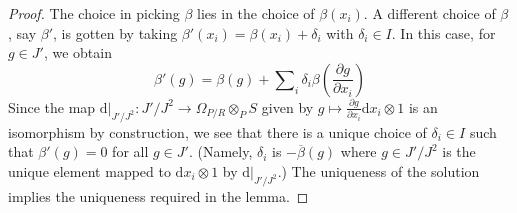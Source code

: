 \begin{proof}
The choice in picking $\beta$ lies in the choice of $\beta(x_i)$.
A different choice of $\beta$, say $\beta'$, is gotten by taking
$\beta'(x_i) = \beta(x_i) + \delta_i$ with $\delta_i \in I$.
In this case, for $g \in J'$, we obtain
$$
\beta'(g) =
\beta(g) + \sum\nolimits_i \delta_i \beta(\frac{\partial g}{\partial x_i})
$$
Since the map $\text{d}|_{J'/J^2} : J'/J^2 \to \Omega_{P/R} \otimes_P S$
given by $g \mapsto \frac{\partial g}{\partial x_i}\text{d}x_i \otimes 1$
is an isomorphism by construction, we see that there is a unique choice
of $\delta_i \in I$ such that $\beta'(g) = 0$ for all $g \in J'$.
(Namely, $\delta_i$ is $-\overline{\beta}(g)$ where $g \in J'/J^2$
is the unique element mapped to $\text{d}x_i \otimes 1$
by $\text{d}|_{J'/J^2}$.) The uniqueness of the solution implies the
uniqueness required in the lemma.
\end{proof}